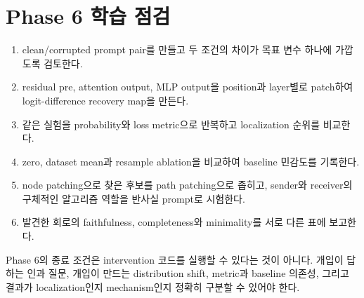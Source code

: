 \section{Phase 6 학습 점검}

\begin{studybox}
\begin{enumerate}
  \item clean/corrupted prompt pair를 만들고 두 조건의 차이가 목표 변수 하나에 가깝도록 검토한다.
  \item residual pre, attention output, MLP output을 position과 layer별로 patch하여 logit-difference recovery map을 만든다.
  \item 같은 실험을 probability와 loss metric으로 반복하고 localization 순위를 비교한다.
  \item zero, dataset mean과 resample ablation을 비교하여 baseline 민감도를 기록한다.
  \item node patching으로 찾은 후보를 path patching으로 좁히고, sender와 receiver의 구체적인 알고리즘 역할을 반사실 prompt로 시험한다.
  \item 발견한 회로의 faithfulness, completeness와 minimality를 서로 다른 표에 보고한다.
\end{enumerate}
\end{studybox}

\begin{factbox}
Phase 6의 종료 조건은 intervention 코드를 실행할 수 있다는 것이 아니다.
개입이 답하는 인과 질문, 개입이 만드는 distribution shift, metric과 baseline 의존성, 그리고 결과가 localization인지 mechanism인지 정확히 구분할 수 있어야 한다.
\end{factbox}
